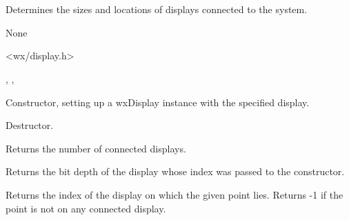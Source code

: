 \section{}\label{wxdisplay}

Determines the sizes and locations of displays connected to the system.


None


<wx/display.h>


, , 



\label{wxdisplayconstr}


Constructor, setting up a wxDisplay instance with the specified display.






Destructor.


\label{wxdisplaygetcount}


Returns the number of connected displays.


\label{wxdisplaygetdepth}


Returns the bit depth of the display whose index was passed to the constructor.


\label{wxdisplaygetfrompoint}


Returns the index of the display on which the given point lies.  Returns -1 if
the point is not on any connected display.


